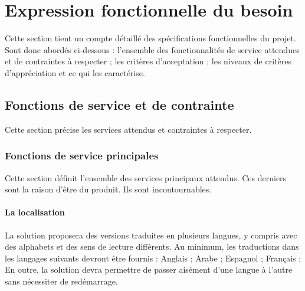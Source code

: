 \documentclass[11pt,fleqn]{book} %
\begin{document}
\pagestyle{empty} %

\tableofcontents %

\cleardoublepage %

\pagestyle{fancy} %






\chapter{Expression fonctionnelle du besoin}
Cette section tient un compte détaillé des spécifications fonctionnelles du projet. Sont donc abordés ci-dessous :
l'ensemble des fonctionnalités de service attendues et de contraintes à respecter ;
les critères d'acceptation ;
les niveaux de critères d'appréciation et ce qui les caractérise. 

\section{Fonctions de service et de contrainte}
Cette section précise les services attendus et contraintes à respecter.

\subsection{Fonctions de service principales}
Cette section définit l'ensemble des services principaux attendus. Ces derniers sont la raison d'être du produit. Ils sont incontournables.

\subsubsection{La localisation}
La solution proposera des versions traduites en plusieurs langues, y compris avec des alphabets et des sens de lecture différents. Au minimum, les traductions dans les langages suivants devront être fournis :
Anglais ;
Arabe ;
Espagnol ;
Français ;
En outre, la solution devra permettre de passer aisément d'une langue à l'autre sans nécessiter de redémarrage.
\end{document}
